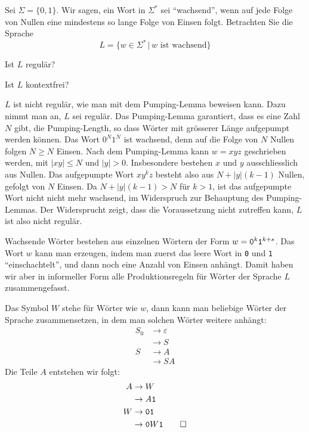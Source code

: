 Sei $\Sigma=\{0,1\}$.
Wir sagen, ein Wort in $\Sigma^*$ sei ``wachsend'',
wenn auf jede Folge von Nullen eine mindestens
so lange Folge von Einsen folgt.
Betrachten Sie die Sprache
\[
L=\{
w\in \Sigma^*\,|\, \text{$w$ ist wachsend}
\}
\]
\begin{teilaufgaben}
\item Ist $L$ regulär?
\item Ist $L$ kontextfrei?
\end{teilaufgaben}


\begin{loesung}
\begin{teilaufgaben}
\item
$L$ ist nicht regulär, wie man mit dem Pumping-Lemma beweisen kann.
Dazu nimmt man an, $L$ sei regulär. Das Pumping-Lemma garantiert, dass
es eine Zahl $N$ gibt, die Pumping-Length, so dass Wörter mit grösserer
Länge aufgepumpt werden können. Das Wort $0^N1^N$ ist wachsend, denn
auf die Folge von $N$ Nullen folgen $N\ge N$ Einsen. Nach dem Pumping-Lemma
kann $w=xyz$ geschrieben werden, mit $|xy|\le N$ und $|y|>0$. Insbesondere bestehen
$x$ und $y$ ausschliesslich aus Nullen. Das aufgepumpte Wort
$xy^kz$ besteht also aus $N+|y|(k-1)$ Nullen, gefolgt von $N$ Einsen.
Da $N+|y|(k-1) > N$ für $k>1$, ist das aufgepumpte Wort nicht nicht
mehr wachsend, im Widerspruch zur Behauptung des Pumping-Lemmas. Der
Widersprucht zeigt, dass die Voraussetzung nicht zutreffen kann, $L$
ist also nicht regulär.
\item
Wachsende Wörter bestehen aus einzelnen Wörtern der Form
$w={\tt 0}^k{\tt 1}^{k+s}$.  Das Wort $w$ kann man erzeugen,
indem man zuerst das leere Wort in {\tt 0} und {\tt 1}
``einschachtelt'', und dann noch eine Anzahl von Einsen anhängt.
Damit haben wir aber in informeller Form alle Produktionsregeln
für Wörter der Sprache $L$ zusammengefasst.

Das Symbol $W$ stehe für Wörter wie $w$, dann kann man beliebige Wörter der
Sprache zusammensetzen, in dem man solchen Wörter weitere anhängt:
\begin{align*}
S_0&\to \varepsilon\\
   &\to S\\
S&\to A\\
 &\to SA
\end{align*}
Die Teile $A$ entstehen wir folgt:
\begin{align*}
A&\to W\\
 &\to A{\tt 1}\\
W&\to {\tt01}\\
 &\to {\tt 0}W{\tt 1}
\qedhere
\end{align*}
\end{teilaufgaben}
\end{loesung}
